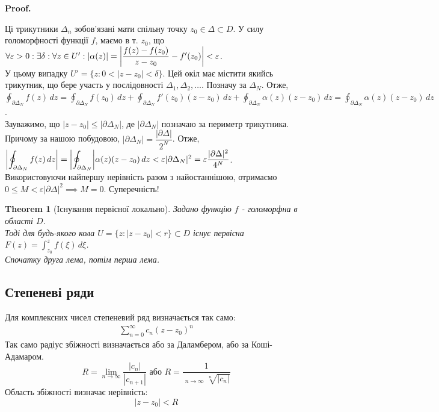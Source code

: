 \documentclass[a4paper, 10pt]{article}
\makeatletter
\DeclareMathOperator*\uplim{\overline{lim}}
\def\qed{$\blacksquare$}
\theoremstyle{theoremdd}
\newtheorem{theorem}{Theorem}[subsection]
\theoremstyle{theoremdd}
\theoremstyle{theoremdd}
\theoremstyle{theoremdd}
\theoremstyle{theoremdd}
\theoremstyle{theoremdd}
\theoremstyle{theoremdd}
\theoremstyle{theoremdd}
\renewenvironment{proof}[1][Proof.\\]{\par
\pushQED{\hfill \qed}%
\normalfont \topsep6\p@\@plus6\p@\relax
\trivlist
\item\relax
{\bfseries
#1\@addpunct{.}}\hspace\labelsep\ignorespaces
}{%
\popQED\endtrivlist\@endpefalse
}
\makeatother
\begin{document}
\begin{proof}
Ці трикутники $\Delta_n$ зобов'язані мати спільну точку $z_0 \in \Delta \subset D$. У силу голоморфності функції $f$, маємо в т. $z_0$, що\\
$\forall \varepsilon > 0: \exists \delta: \forall z \in U': \abs{\alpha(z)} = \abs{ \dfrac{f(z)-f(z_0)}{z-z_0} - f'(z_0) } < \varepsilon$.\\
У цьому випадку $U' = \{z: 0<|z-z_0|<\delta\}$. Цей окіл має містити якийсь трикутник, що бере участь у послідовності $\Delta_1,\Delta_2,\dots$. Позначу за $\Delta_N$. Отже,\\
$\displaystyle\oint_{\partial \Delta_N} f(z)\,dz = \oint_{\partial \Delta_N} f(z_0)\,dz + \oint_{\partial \Delta_N} f'(z_0)(z-z_0)\,dz + \oint_{\partial \Delta_N} \alpha(z)(z-z_0)\,dz = \oint_{\partial \Delta_N} \alpha(z)(z-z_0)\,dz$.\\
Зауважимо, що $|z-z_0| \leq |\partial \Delta_N|$, де $|\partial \Delta_N|$ позначаю за периметр трикутника. Причому за нашою побудовою, $|\partial \Delta_N| = \dfrac{|\partial \Delta|}{2^N}$. Отже,\\
$\displaystyle\abs{\oint_{\partial \Delta_N} f(z)\,dz} = \abs{\oint_{\partial \Delta_N}} \alpha(z)(z-z_0)\,dz < \varepsilon |\partial \Delta_N|^2 = \varepsilon \dfrac{|\partial \Delta|^2}{4^N}$.\\
Використовуючи найпершу нерівність разом з найостаннішою, отримаємо $0 \leq M < \varepsilon |\partial \Delta|^2 \implies M =0$. Суперечність!
\end{proof}

\begin{theorem}[Існування первісної локально]
Задано функцію $f$ - голоморфна в області $D$.\\
Тоді для будь-якого кола $U = \{z: |z-z_0| < r\} \subset D$ існує первісна $F(z) = \displaystyle\int_{z_0}^z f(\xi)\,d\xi$.\\
\textit{Спочатку друга лема, потім перша лема.}
\end{theorem}
	
\subsection{Степеневі ряди}
Для комплексних чисел степеневий ряд визначається так само:
\begin{align*}
	\sum_{n=0}^{\infty} c_n(z-z_0)^n
\end{align*}
Так само радіус збіжності визначається або за Даламбером, або за Коші-Адамаром.
	$$R = \displaystyle\lim_{n \to \infty}\frac{|c_n|}{|c_{n+1}|} \text{ або } R = \displaystyle\frac{1}{\displaystyle\uplim_{n \to \infty} \sqrt[n]{|c_n|}}$$
Область збіжності визначає нерівність: $$|z-z_0|<R$$
\end{document}
